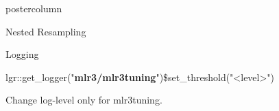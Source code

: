 \documentclass{beamer}
\begin{document}
\begin{frame}[fragile]{}
\begin{columns}
\begin{column}{.245\textwidth}
\begin{beamercolorbox}[center]{postercolumn}
\begin{minipage}{.98\textwidth}
{\begin{myblock}{Nested Resampling}
						\end{myblock}
						\begin{myblock}{Logging}
							\begin{codebox}
								{\scriptsize
									lgr::get\_logger("\textbf{mlr3/mlr3tuning}")\$set\_threshold("<level>")}
							\end{codebox}
							Change log-level only for mlr3tuning.
						\end{myblock}
						\vfill}
				\end{minipage}
			\end{beamercolorbox}
		\end{column}
	\end{columns}
\end{frame}
\end{document}
